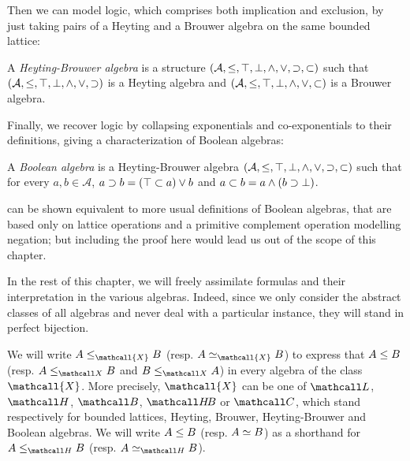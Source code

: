 Then we can model  logic, which comprises both implication and
exclusion, by just taking pairs of a Heyting and a Brouwer algebra on the same
bounded lattice:

\begin{definition}
  A \emph{Heyting-Brouwer algebra} is a structure $(\mathcal{A}, \leq, \top,
  \bot, \land, \lor, \supset, \subset)$ such that $(\mathcal{A}, \leq,
  \top, \bot, \land, \lor, \supset)$ is a Heyting algebra and $(\mathcal{A},
  \leq, \top, \bot, \land, \lor, \subset)$ is a Brouwer algebra.
\end{definition}

Finally, we recover  logic by collapsing exponentials and
co-exponentials to their  definitions, giving a characterization of
Boolean algebras:

\begin{definition}
  A \emph{Boolean algebra} is a Heyting-Brouwer algebra $(\mathcal{A}, \leq,
  \top, \bot, \land, \lor, \supset, \subset)$ such that for every $a, b \in
  \mathcal{A}$, $a \supset b = (\top \subset a) \lor b$ and $a \subset b = a
  \land (b \supset \bot)$.
\end{definition}

\begin{remark}
 can be shown equivalent to more
usual definitions of Boolean algebras, that are based only on lattice operations
and a primitive complement operation modelling negation; but including the proof
here would lead us out of the scope of this chapter.
\end{remark}

In the rest of this chapter, we will freely assimilate formulas and their
interpretation in the various algebras. Indeed, since we only consider the
abstract classes of all algebras and never deal with a particular instance,
they will stand in perfect bijection.

\begin{definition}
  We will write $A \sement_{\mathcall{X}} B$ (resp. $A \semequiv_{\mathcall{X}}
  B$) to express that $A \leq B$ (resp. $A \sementX B$ and $B \sementX A$) in
  every algebra of the class $\mathcall{X}$. More precisely, $\mathcall{X}$ can
  be one of $\Lattice$, $\Heyting$, $\Brouwer$, $\HeytingBrouwer$ or $\Boolean$,
  which stand respectively for bounded lattices, Heyting, Brouwer,
  Heyting-Brouwer and Boolean algebras. We will write $A \leq B$ (resp. $A
  \simeq B$) as a shorthand for $A \sementH B$ (resp. $A \semequiv_{\Heyting}
  B$).
\end{definition}

